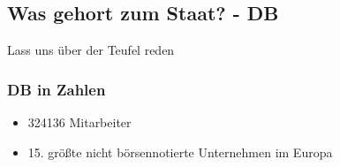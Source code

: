\subsection{Was gehort zum Staat? - DB}

\begin{frameplain}
	\huge
	\centering
	Lass uns über der Teufel reden\\[5ex]
\end{frameplain}
\begin{frame}
\frametitle{DB in Zahlen}
\begin{itemize}
	\item 324136 Mitarbeiter
	\item 15. größte nicht börsennotierte Unternehmen im Europa
\end{itemize}

\end{frame}

